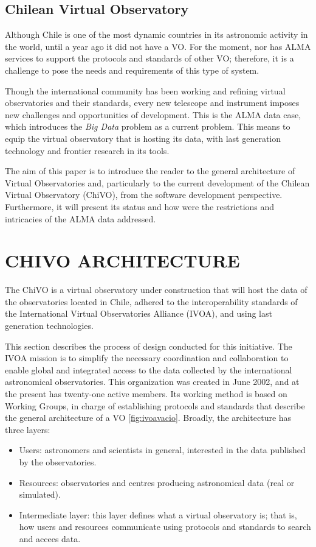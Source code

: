 \documentclass[]{spie}
\begin{document}
\subsection{Chilean Virtual Observatory}
\label{sec:chivo}
Although Chile is one of the most dynamic countries in its astronomic activity
in the world, until a year ago it did not have a VO.  For the moment, nor has
ALMA services to support the protocols and standards of other VO; therefore, it
is a challenge to pose the needs and requirements of this type of system.

Though the international community has been working and refining virtual
observatories and their standards, every new telescope and instrument imposes
new challenges and opportunities of development.  This is the ALMA data case,
which introduces the \emph{Big Data} problem as a current problem.  This means to
equip the virtual observatory that is hosting its data, with last generation
technology and frontier research in its tools.

The aim of this paper is to introduce the reader to the general architecture of
Virtual Observatories and, particularly to the current development of the
Chilean Virtual Observatory (ChiVO), from the software development perspective.
Furthermore, it will present its status and how were the restrictions and
intricacies of the ALMA data addressed.

\section{CHIVO ARCHITECTURE} 
The ChiVO is a virtual observatory under construction that will host the data of the observatories located in Chile, adhered to the interoperability standards of the International Virtual Observatories Alliance (IVOA), and using last generation technologies. 

This section describes the process of design conducted for this initiative.
The IVOA mission is to simplify the necessary coordination and collaboration to enable global and integrated access to the data collected by the international astronomical observatories. This organization was created in June 2002, and at the present has twenty-one active members.  Its working method is based on Working Groups, in charge of establishing protocols and standards that describe the general architecture of a VO \ref{fig:ivoavacio}.  Broadly, the architecture has three layers:
\begin{itemize}
    \item Users:  astronomers and scientists in general, interested in 
        the data published by the observatories.
    \item Resources: observatories and centres producing astronomical 
        data (real or simulated).
    \item Intermediate layer:  this layer defines what a virtual observatory 
        is; that is, how users and resources communicate using protocols and 
        standards to search and accees data.
\end{itemize}
\end{document}
